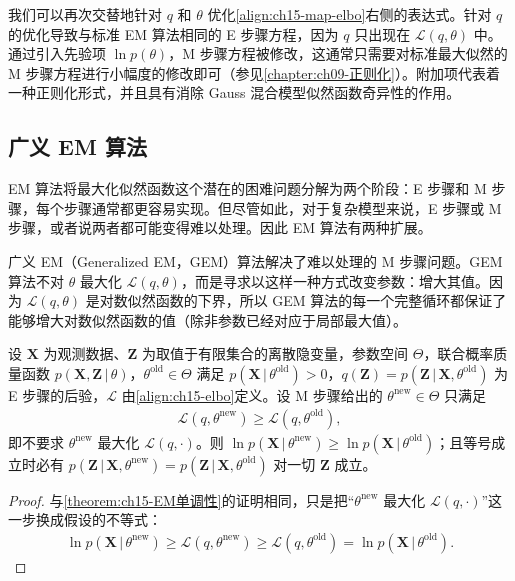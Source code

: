 \documentclass[../../main.tex]{subfiles}
\begin{document}
我们可以再次交替地针对 $q$ 和 $\theta$ 优化\eqref{align:ch15-map-elbo}右侧的表达式。针对 $q$ 的优化导致与标准 EM 算法相同的 E 步骤方程，因为 $q$ 只出现在 $\mathcal{L}(q,\theta)$ 中。通过引入先验项 $\ln p(\theta)$，M 步骤方程被修改，这通常只需要对标准最大似然的 M 步骤方程进行小幅度的修改即可（参见\cref{chapter:ch09-正则化}）。附加项代表着一种正则化形式，并且具有消除 Gauss 混合模型似然函数奇异性的作用。

\subsection{广义 EM 算法}\label{subsection:ch15-广义em}

EM 算法将最大化似然函数这个潜在的困难问题分解为两个阶段：E 步骤和 M 步骤，每个步骤通常都更容易实现。但尽管如此，对于复杂模型来说，E 步骤或 M 步骤，或者说两者都可能变得难以处理。因此 EM 算法有两种扩展。

广义 EM（Generalized EM，GEM）算法解决了难以处理的 M 步骤问题。GEM 算法不对 $\theta$ 最大化 $\mathcal{L}(q,\theta)$，而是寻求以这样一种方式改变参数：增大其值。因为 $\mathcal{L}(q,\theta)$ 是对数似然函数的下界，所以 GEM 算法的每一个完整循环都保证了能够增大对数似然函数的值（除非参数已经对应于局部最大值）。

\begin{proposition}\label{proposition:ch15-GEM单调性}
设 $\bm{X}$ 为观测数据、$\bm{Z}$ 为取值于有限集合的离散隐变量，参数空间 $\Theta$，联合概率质量函数 $p(\bm{X},\bm{Z}\,|\,\theta)$，$\theta^{\text{old}}\in\Theta$ 满足 $p(\bm{X}\,|\,\theta^{\text{old}})>0$，$q(\bm{Z})=p(\bm{Z}\,|\,\bm{X},\theta^{\text{old}})$ 为 E 步骤的后验，$\mathcal{L}$ 由\eqref{align:ch15-elbo}定义。设 M 步骤给出的 $\theta^{\text{new}}\in\Theta$ 只满足
\begin{align*}
\mathcal{L}(q,\theta^{\text{new}})\geqslant\mathcal{L}(q,\theta^{\text{old}}),
\end{align*}
即不要求 $\theta^{\text{new}}$ 最大化 $\mathcal{L}(q,\cdot)$。则 $\ln p(\bm{X}\,|\,\theta^{\text{new}})\geqslant\ln p(\bm{X}\,|\,\theta^{\text{old}})$；且等号成立时必有 $p(\bm{Z}\,|\,\bm{X},\theta^{\text{new}})=p(\bm{Z}\,|\,\bm{X},\theta^{\text{old}})$ 对一切 $\bm{Z}$ 成立。
\end{proposition}
\begin{proof}
与\cref{theorem:ch15-EM单调性}的证明相同，只是把“$\theta^{\text{new}}$ 最大化 $\mathcal{L}(q,\cdot)$”这一步换成假设的不等式：
\begin{align*}
\ln p(\bm{X}\,|\,\theta^{\text{new}})\geqslant\mathcal{L}(q,\theta^{\text{new}})\geqslant\mathcal{L}(q,\theta^{\text{old}})=\ln p(\bm{X}\,|\,\theta^{\text{old}}).
\end{align*}
\end{proof}
\end{document}
